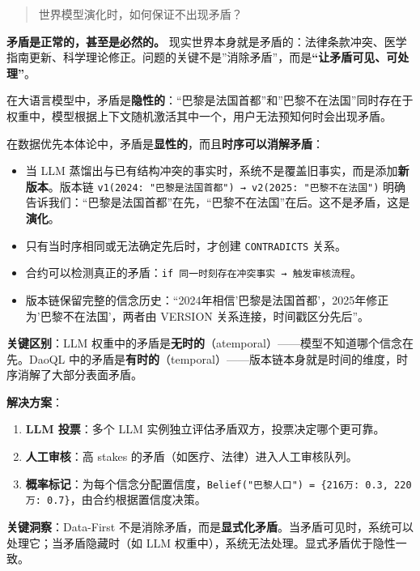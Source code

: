 \documentclass[11pt,a4paper]{ctexart}
\begin{document}
\begin{quote}
世界模型演化时，如何保证不出现矛盾？
\end{quote}

\textbf{矛盾是正常的，甚至是必然的。}
现实世界本身就是矛盾的：法律条款冲突、医学指南更新、科学理论修正。问题的关键不是''消除矛盾''，而是\textbf{``让矛盾可见、可处理''}。

在大语言模型中，矛盾是\textbf{隐性的}：``巴黎是法国首都''和''巴黎不在法国''同时存在于权重中，模型根据上下文随机激活其中一个，用户无法预知何时会出现矛盾。

在数据优先本体论中，矛盾是\textbf{显性的}，而且\textbf{时序可以消解矛盾}：

\begin{itemize}
\tightlist
\item
  当 LLM
  蒸馏出与已有结构冲突的事实时，系统不是覆盖旧事实，而是添加\textbf{新版本}。版本链
  \texttt{v1(2024:\ "巴黎是法国首都")\ →\ v2(2025:\ "巴黎不在法国")}
  明确告诉我们：``巴黎是法国首都''在先，``巴黎不在法国''在后。这不是矛盾，这是\textbf{演化}。
\item
  只有当时序相同或无法确定先后时，才创建 \texttt{CONTRADICTS} 关系。
\item
  合约可以检测真正的矛盾：\texttt{if\ 同一时刻存在冲突事实\ →\ 触发审核流程}。
\item
  版本链保留完整的信念历史：``2024年相信'巴黎是法国首都'，2025年修正为'巴黎不在法国'，两者由
  VERSION 关系连接，时间戳区分先后''。
\end{itemize}

\textbf{关键区别}：LLM
权重中的矛盾是\textbf{无时的}（atemporal）------模型不知道哪个信念在先。DaoQL
中的矛盾是\textbf{有时的}（temporal）------版本链本身就是时间的维度，时序消解了大部分表面矛盾。

\textbf{解决方案}：

\begin{enumerate}
\def\labelenumi{\arabic{enumi}.}
\tightlist
\item
  \textbf{LLM 投票}：多个 LLM 实例独立评估矛盾双方，投票决定哪个更可靠。
\item
  \textbf{人工审核}：高 stakes 的矛盾（如医疗、法律）进入人工审核队列。
\item
  \textbf{概率标记}：为每个信念分配置信度，\texttt{Belief("巴黎人口")\ =\ \{216万:\ 0.3,\ 220万:\ 0.7\}}，由合约根据置信度决策。
\end{enumerate}

\textbf{关键洞察}：Data-First
不是消除矛盾，而是\textbf{显式化矛盾}。当矛盾可见时，系统可以处理它；当矛盾隐藏时（如
LLM 权重中），系统无法处理。显式矛盾优于隐性一致。
\end{document}
